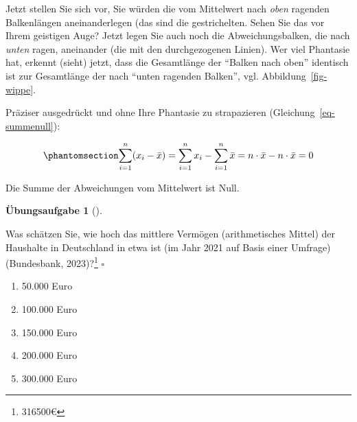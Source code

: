 \documentclass[
  letterpaper,
]{scrbook}
\providecommand{\tightlist}{%
  \setlength{\itemsep}{0pt}\setlength{\parskip}{0pt}}\usepackage{longtable,booktabs,array}
\theoremstyle{definition}
\theoremstyle{definition}
\theoremstyle{definition}
\newtheorem{exercise}{Übungsaufgabe}[chapter]
\theoremstyle{remark}
\begin{document}
Jetzt stellen Sie sich vor, Sie würden die vom Mittelwert nach
\emph{oben} ragenden Balkenlängen aneinanderlegen (das sind die
gestrichelten. Sehen Sie das vor Ihrem geistigen Auge? Jetzt legen Sie
auch noch die Abweichungsbalken, die nach \emph{unten} ragen, aneinander
(die mit den durchgezogenen Linien). Wer viel Phantasie hat, erkennt
(sieht) jetzt, dass die Gesamtlänge der ``Balken nach oben'' identisch
ist zur Gesamtlänge der nach ``unten ragenden Balken'', vgl.
Abbildung~\ref{fig-wippe}.

Präziser ausgedrückt und ohne Ihre Phantasie zu strapazieren
(Gleichung~\ref{eq-summenull}):

\begin{equation}\phantomsection\label{eq-summenull}{\sum_{i=1}^n (x_i-\bar{x})=\sum_{i=1}^n x_i - \sum_{i=1}^n \bar{x} = n\cdot \bar{x} - n\cdot \bar{x}=0}\end{equation}

\begin{tcolorbox}[enhanced jigsaw, left=2mm, toptitle=1mm, toprule=.15mm, rightrule=.15mm, leftrule=.75mm, breakable, colbacktitle=quarto-callout-note-color!10!white, colback=white, coltitle=black, bottomtitle=1mm, opacityback=0, title=\textcolor{quarto-callout-note-color}{\faInfo}\hspace{0.5em}{Hinweis}, colframe=quarto-callout-note-color-frame, arc=.35mm, opacitybacktitle=0.6, bottomrule=.15mm, titlerule=0mm]

Die Summe der Abweichungen vom Mittelwert ist Null.

\end{tcolorbox}

\begin{exercise}[]\protect\hypertarget{exr-mw-wealth1}{}\label{exr-mw-wealth1}

Was schätzen Sie, wie hoch das mittlere Vermögen (arithmetisches Mittel)
der Haushalte in Deutschland in etwa ist (im Jahr 2021 auf Basis einer
Umfrage) (Bundesbank, 2023)?\footnote{316500€} \(\square\)

\begin{enumerate}
\def\labelenumi{\alph{enumi})}
\tightlist
\item
  50.000 Euro
\item
  100.000 Euro
\item
  150.000 Euro
\item
  200.000 Euro
\item
  300.000 Euro
\end{enumerate}

\end{exercise}
\end{document}
